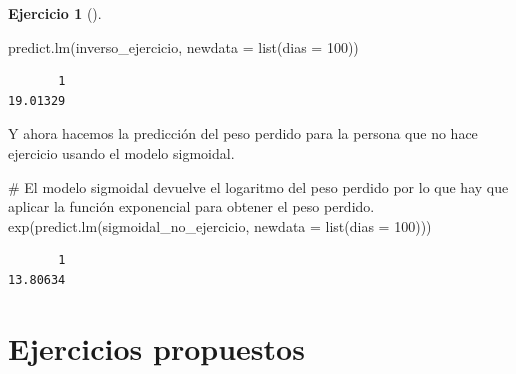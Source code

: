 \documentclass[
  a4paper,
]{scrreport}
\newenvironment{Shaded}{\begin{snugshade}}{\end{snugshade}}
\newcommand{\AttributeTok}[1]{\textcolor[rgb]{0.40,0.45,0.13}{#1}}
\newcommand{\CommentTok}[1]{\textcolor[rgb]{0.37,0.37,0.37}{#1}}
\newcommand{\DecValTok}[1]{\textcolor[rgb]{0.68,0.00,0.00}{#1}}
\newcommand{\FunctionTok}[1]{\textcolor[rgb]{0.28,0.35,0.67}{#1}}
\newcommand{\NormalTok}[1]{\textcolor[rgb]{0.00,0.23,0.31}{#1}}
\theoremstyle{definition}
\newtheorem{exercise}{Ejercicio}[chapter]
\theoremstyle{remark}
\begin{document}
\begin{exercise}[]
\begin{enumerate}
\begin{tcolorbox}
\begin{Shaded}
\begin{Highlighting}[]
\FunctionTok{predict.lm}\NormalTok{(inverso\_ejercicio, }\AttributeTok{newdata =} \FunctionTok{list}\NormalTok{(}\AttributeTok{dias =} \DecValTok{100}\NormalTok{))}
\end{Highlighting}
\end{Shaded}

\begin{verbatim}
       1 
19.01329 
\end{verbatim}

  Y ahora hacemos la predicción del peso perdido para la persona que no
  hace ejercicio usando el modelo sigmoidal.

\begin{Shaded}
\begin{Highlighting}[]
\CommentTok{\# El modelo sigmoidal devuelve el logaritmo del peso perdido por lo que hay que aplicar la función exponencial para obtener el peso perdido.}
\FunctionTok{exp}\NormalTok{(}\FunctionTok{predict.lm}\NormalTok{(sigmoidal\_no\_ejercicio, }\AttributeTok{newdata =} \FunctionTok{list}\NormalTok{(}\AttributeTok{dias =} \DecValTok{100}\NormalTok{)))}
\end{Highlighting}
\end{Shaded}

\begin{verbatim}
       1 
13.80634 
\end{verbatim}

  \end{tcolorbox}
\end{enumerate}

\end{exercise}

\hypertarget{ejercicios-propuestos-3}{%
\section{Ejercicios propuestos}\label{ejercicios-propuestos-3}}
\end{document}
